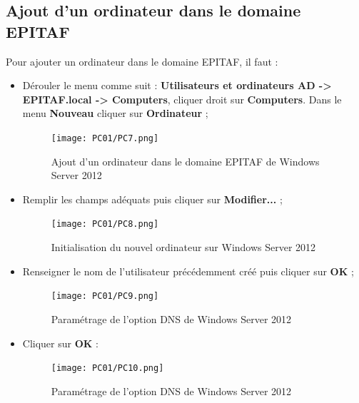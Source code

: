 \newpage
\subsection{Ajout d'un ordinateur dans le domaine EPITAF}

Pour ajouter un ordinateur dans le domaine EPITAF, il faut :
\begin{itemize}
\item Dérouler le menu comme suit : \textbf{Utilisateurs et ordinateurs AD -> EPITAF.local -> Computers}, cliquer droit sur \textbf{Computers}. Dans le menu \textbf{Nouveau} cliquer sur \textbf{Ordinateur} ;
\begin{figure}[h!]
    \begin{center}
        \texttt{[image: PC01/PC7.png]}
        \caption{Ajout d'un ordinateur dans le domaine EPITAF de Windows Server 2012}
    \end{center}
\end{figure}
\FloatBarrier

\item Remplir les champs adéquats puis cliquer sur \textbf{Modifier...} ;
\begin{figure}[h!]
    \begin{center}
        \texttt{[image: PC01/PC8.png]}
        \caption{Initialisation du nouvel ordinateur sur Windows Server 2012}
    \end{center}
\end{figure}
\FloatBarrier

\item Renseigner le nom de l'utilisateur précédemment créé puis cliquer sur \textbf{OK} ;
\begin{figure}[h!]
    \begin{center}
        \texttt{[image: PC01/PC9.png]}
        \caption{Paramétrage de l'option DNS de Windows Server 2012}
    \end{center}
\end{figure}
\FloatBarrier

\item Cliquer sur \textbf{OK} :
\begin{figure}[h!]
    \begin{center}
        \texttt{[image: PC01/PC10.png]}
        \caption{Paramétrage de l'option DNS de Windows Server 2012}
    \end{center}
\end{figure}
\FloatBarrier
\end{itemize}